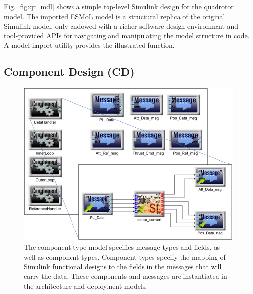 
Fig. \ref{fig:qr_mdl} shows a simple top-level Simulink design for the quadrotor model.
The imported ESMoL model is a structural replica of the 
original Simulink model, only endowed with a richer software design environment and tool-provided APIs for 
navigating and manipulating the model structure in code.  A model import utility provides the illustrated 
function.

\subsection{Component Design (CD)}

\begin{figure}
\centering
\includegraphics[width=0.75\columnwidth]{figures/quadrotor_types.png}
    \caption{The component type model specifies message types and fields, as well as component types.  Component types specify the mapping of Simulink functional designs to the fields in the messages that will carry the data.  These components and messages are instantiated in the architecture and deployment models.}
    \label{fig:qr_types}
\end{figure}

